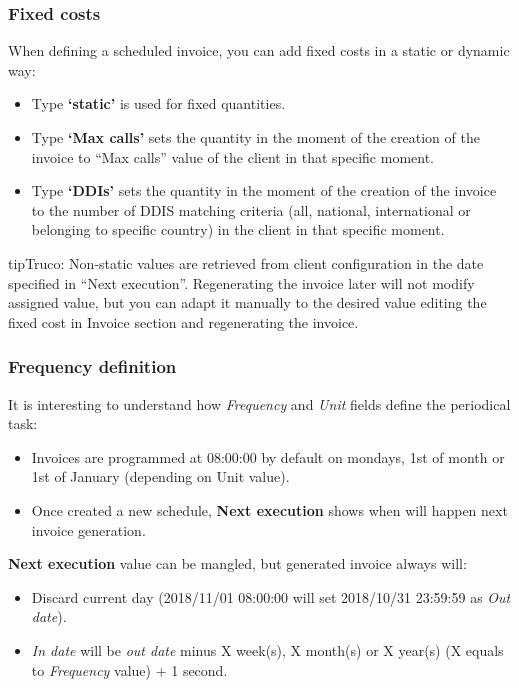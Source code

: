 \documentclass[letterpaper,10pt,spanish]{sphinxmanual}
\begin{document}
\subsubsection{Fixed costs}
\label{administration_portal/brand/invoicing/invoice_schedulers:fixed-costs}
When defining a scheduled invoice, you can add fixed costs in a static or dynamic way:
\begin{itemize}
\item {} 
Type \textbf{`static'} is used for fixed quantities.

\item {} 
Type \textbf{`Max calls'} sets the quantity in the moment of the creation of the invoice to
``Max calls'' value of the client in that specific moment.

\item {} 
Type \textbf{`DDIs'} sets the quantity in the moment of the creation of the invoice to
the number of DDIS matching criteria (all, national, international or belonging to specific country)
in the client in that specific moment.

\end{itemize}

\begin{notice}{tip}{Truco:}
Non-static values are retrieved from client configuration in the date specified in ``Next execution''.
Regenerating the invoice later will not modify assigned value, but you can adapt it manually to
the desired value editing the fixed cost in Invoice section and regenerating the invoice.
\end{notice}


\subsubsection{Frequency definition}
\label{administration_portal/brand/invoicing/invoice_schedulers:frequency-definition}
It is interesting to understand how \emph{Frequency} and \emph{Unit} fields define the periodical task:
\begin{itemize}
\item {} 
Invoices are programmed at 08:00:00 by default on mondays, 1st of month or 1st of January (depending on Unit value).

\item {} 
Once created a new schedule, \textbf{Next execution} shows when will happen next invoice generation.

\end{itemize}

\textbf{Next execution} value can be mangled, but generated invoice always will:
\begin{itemize}
\item {} 
Discard current day (2018/11/01 08:00:00 will set 2018/10/31 23:59:59 as \emph{Out date}).

\item {} 
\emph{In date} will be \emph{out date} minus X week(s), X month(s) or X year(s) (X equals to \emph{Frequency} value) + 1 second.

\end{itemize}
\end{document}
